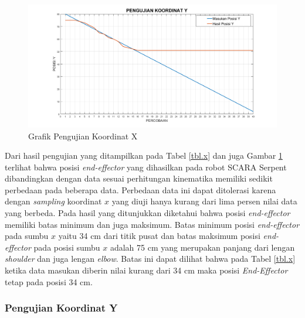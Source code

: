 \fontsize{12}{15}\selectfont
\begin{figure}[H]
	\centering
	\includegraphics[width=12cm]{gambar/px.png}
	\caption{Grafik Pengujian Koordinat X}
	\label{pic.koordinatx}
\end{figure}

Dari hasil pengujian yang ditampilkan pada Tabel \ref{tbl.x} dan juga Gambar \ref{pic.koordinatx} terlihat bahwa posisi \textit{end-effector} yang dihasilkan pada robot SCARA Serpent dibandingkan dengan data sesuai perhitungan kinematika memiliki sedikit perbedaan pada beberapa data. Perbedaan data ini dapat ditolerasi karena dengan \textit{sampling} koordinat $x$ yang diuji hanya kurang dari lima persen nilai data yang berbeda. Pada hasil yang ditunjukkan diketahui bahwa posisi \textit{end-effector} memiliki batas minimum dan juga maksimum. Batas minimum posisi \textit{end-effector} pada sumbu $x$ yaitu 34 cm dari titik pusat dan batas maksimum posisi \textit{end-effector} pada posisi sumbu $x$ adalah 75 cm yang merupakan panjang dari lengan \textit{shoulder} dan juga lengan \textit{elbow}. Batas ini dapat dilihat bahwa pada Tabel \ref{tbl.x} ketika data masukan diberin nilai kurang dari 34 cm maka posisi \textit{End-Effector} tetap pada posisi 34 cm.


\subsubsection{Pengujian Koordinat Y}

